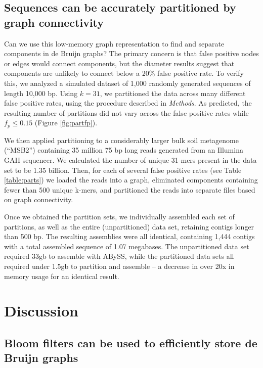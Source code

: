 \documentclass{pnastwo}
\begin{document}
\begin{article}
\subsection{Sequences can be accurately partitioned by graph connectivity}


Can we use this low-memory graph representation to find and separate
components in de Bruijn graphs?  The primary concern is that false positive
nodes or edges would connect components, but the diameter results suggest that
components are unlikely to connect below a 20\% false positive rate.
To verify this, we analyzed a simulated dataset of 1,000
randomly generated sequences of length 10,000 bp.  Using $k=31$,
we partitioned the data across many different false positive rates,
using the procedure described in \emph{Methods}. As predicted, the
resulting number of partitions did not vary across the false positive
rates while $f_p \le 0.15$ (Figure \ref{fig:partfp}).

We then applied partitioning to a considerably larger bulk soil
metagenome (``MSB2'') containing 35 million 75 bp long reads generated
from an Illumina GAII sequencer.  We calculated the number of unique
31-mers present in the data set to be 1.35 billion. Then, for each of
several false positive rates (see Table \ref{table:parts}) we loaded
the reads into a graph, eliminated components containing fewer than
500 unique k-mers, and partitioned the reads into separate files based
on graph connectivity.

Once we obtained the partition sets, we individually assembled each
set of partitions, as well as the entire (unpartitioned) data set,
retaining contigs longer than 500 bp.  The resulting assemblies were
all identical, containing 1,444 contigs with a total assembled
sequence of 1.07 megabases.  The unpartitioned data set required 33gb to
assemble with ABySS, while the partitioned data sets all required
under 1.5gb to partition and assemble -- a decrease in over 20x
in memory usage for an identical result.


\section{Discussion}


\subsection{Bloom filters can be used to efficiently store de Bruijn graphs}


\end{article}
\end{document}
